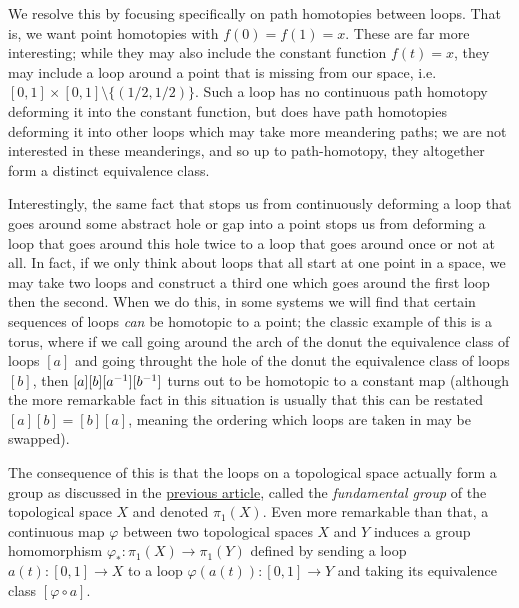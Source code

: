 \documentclass[11pt]{article}
\begin{document}
We resolve this by focusing specifically on path homotopies between loops. That is, we want point homotopies with $f(0) = f(1) = x$. These are far more interesting; while they may also include the constant function $f(t) = x$, they may include a loop around a point that is missing from our space, i.e. $[0,1] \times [0,1] \setminus \{(1/2,1/2)\}$. Such a loop has no continuous path homotopy deforming it into the constant function, but does have path homotopies deforming it into other loops which may take more meandering paths; we are not interested in these meanderings, and so up to path-homotopy, they altogether form a distinct equivalence class.


Interestingly, the same fact that stops us from continuously deforming a loop that goes around some abstract hole or gap into a point stops us from deforming a loop that goes around this hole twice to a loop that goes around once or not at all. In fact, if we only think about loops that all start at one point in a space, we may take two loops and construct a third one which goes around the first loop then the second. When we do this, in some systems we will find that certain sequences of loops \emph{can} be homotopic to a point; the classic example of this is a torus, where if we call going around the arch of the donut the equivalence class of loops $[a]$ and going throught the hole of the donut the equivalence class of loops $[b]$, then $[a][b][a^{-1}][b^{-1}]$ turns out to be homotopic to a constant map (although the more remarkable fact in this situation is usually that this can be restated $[a][b] = [b] [a]$, meaning the ordering which loops are taken in may be swapped).

The consequence of this is that the loops on a topological space actually form a group as discussed in the \hyperlink{https://clockssugars.blog/articles/0326-matrixgroups/}{previous article}, called the \emph{fundamental group} of the topological space $X$ and denoted $\pi_1(X)$. Even more remarkable than that, a continuous map $\varphi$ between two topological spaces $X$ and $Y$ induces a group homomorphism $\varphi_* \colon \pi_1(X) \to \pi_1(Y)$ defined by sending a loop $a(t) \colon [0,1] \to X$ to a loop $ \varphi(a(t)) \colon [0,1] \to Y$ and taking its equivalence class $[\varphi\circ a]$.
\end{document}
